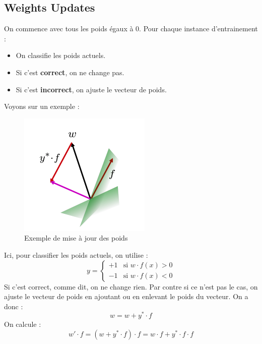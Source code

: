 \subsection{Weights Updates}
\label{sub:weights_updates}
On commence avec tous les poids égaux à 0. Pour chaque instance d'entrainement :
\begin{itemize}[label=\textbullet]
    \item On classifie les poids actuels.
    \item Si c'est \textbf{correct}, on ne change pas.
    \item Si c'est \textbf{incorrect}, on ajuste le vecteur de poids.
\end{itemize}

\begin{example}
    Voyons sur un exemple :
    \begin{figure}[H]
        \centering
        \includegraphics[scale=0.6]{pictures/example_waights_update.png}
        \caption{Exemple de mise à jour des poids}
    \end{figure}
    Ici, pour classifier les poids actuels, on utilise :
    \begin{equation*}
        y=
        \begin{cases}
            +1 & \text{si } w\cdot f(x) > 0\\
            -1 & \text{si } w\cdot f(x) < 0
        \end{cases}
    \end{equation*}
    Si c'est correct, comme dit, on ne change rien. Par contre si ce n'est pas le cas, on ajuste le vecteur de poids en ajoutant
    ou en enlevant le poids du vecteur. On a donc :
    \begin{equation*}
        w = w+y^*\cdot f
    \end{equation*}
    On calcule : 
    \begin{equation*}
        w' \cdot f = (w+y^*\cdot f)\cdot f = w\cdot f + y^*\cdot f\cdot f
    \end{equation*}
\end{example}

